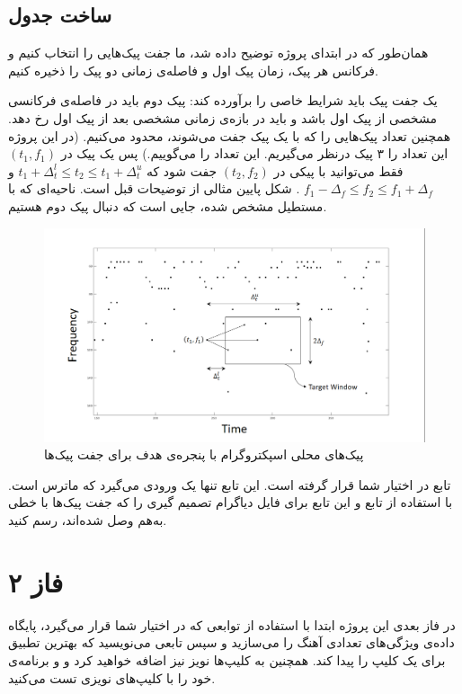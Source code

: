 \documentclass{utsignal}
\begin{document}
	\subsection{ساخت جدول} \label{ssec:construct-table}
	همان‌طور که در ابتدای پروژه توضیح داده شد، ما جفت پیک‌هایی را انتخاب کنیم و فرکانس هر پیک، زمان پیک اول و فاصله‌ی زمانی دو پیک را ذخیره کنیم.
	
	یک جفت پیک باید شرایط خاصی را برآورده کند: پیک دوم باید در فاصله‌ی فرکانسی مشخصی از پیک اول باشد و باید در بازه‌ی زمانی مشخصی بعد از پیک اول رخ دهد. همچنین تعداد پیک‌هایی را که با یک پیک جفت می‌شوند، محدود می‌کنیم. (در این پروژه این تعداد را ۳ پیک درنظر می‌گیریم. این تعداد را  می‌گوییم.) پس یک پیک در $(t_1, f_1)$ فقط می‌توانید با پیکی در $(t_2, f_2)$ جفت شود که $t_1+\Delta_t^l \le t_2 \le t_1+\Delta_t^u$ و 	$f_1 - \Delta_f \le f_2 \le f_1+\Delta_f$  . شکل پایین مثالی از توضیحات قبل است. ناحیه‌ای که با مستطیل مشخص شده، جایی است که دنبال پیک دوم هستیم.
	\begin{figure}[h]
		\includegraphics[width=\linewidth]{constellation-map.png}
		\caption{پیک‌های محلی اسپکتروگرام با پنجره‌ی هدف برای جفت پیک‌ها}
	\end{figure}
	
	تابع  در اختیار شما قرار گرفته است. این تابع تنها یک ورودی می‌گیرد که ماترس  است. با استفاده از تابع  و این تابع برای فایل  دیاگرام تصمیم گیری را که جفت پیک‌ها با خطی به‌هم وصل شده‌اند، رسم کنید.
	 
	\section*{فاز ۲}
	در فاز بعدی این پروژه ابتدا با استفاده از توابعی که در اختیار شما قرار می‌گیرد، پایگاه داده‌ی ویژگی‌های تعدادی آهنگ را می‌سازید و سپس تابعی می‌نویسید که بهترین تطبیق برای یک کلیپ را پیدا کند. همچنین به کلیپ‌ها نویز نیز اضافه خواهید کرد و و برنامه‌ی خود را با کلیپ‌های نویزی تست می‌کنید.
\end{document}
